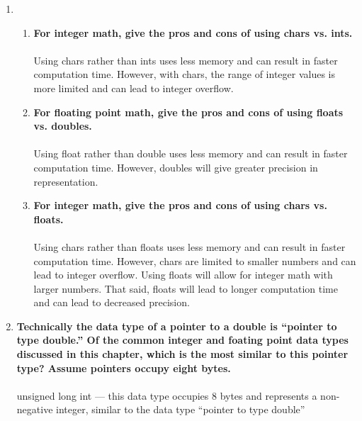 \documentclass{article}
\begin{document}
\begin{enumerate}[label=\textbf{\arabic*})]
    \item
        \begin{enumerate}[label=\textbf{\alph*}.]
            \item  \textbf{For integer math, give the pros and cons of using chars vs. ints.} \\
            \\
            Using chars rather than ints uses less memory and can result in faster computation time. However, with chars, the range of integer values is more limited and can lead to integer overflow.
            \\
            \item \textbf{For floating point math, give the pros and cons of using floats vs. doubles.} \\
            \\
            Using float rather than double uses less memory and can result in faster computation time. However, doubles will give greater precision in representation.
            \\
            \item \textbf{For integer math, give the pros and cons of using chars vs. floats.} \\
            \\
            Using chars rather than floats uses less memory and can result in faster computation time. However, chars are limited to smaller numbers and can lead to integer overflow. Using floats will allow for integer math with larger numbers. That said, floats will lead to longer computation time and can lead to decreased precision.
        \end{enumerate}
    
    \setcounter{enumi}{15}
    \item \textbf{Technically the data type of a pointer to a double is “pointer to type double.” Of the common integer and foating point data types discussed in this chapter, which is the most similar to this pointer type? Assume pointers occupy eight bytes.}\\
    \\
    unsigned long int --- this data type occupies 8 bytes and represents a non-negative integer, similar to the data type ``pointer to type double''
    
    \pagebreak
    

\end{enumerate}
\end{document}
